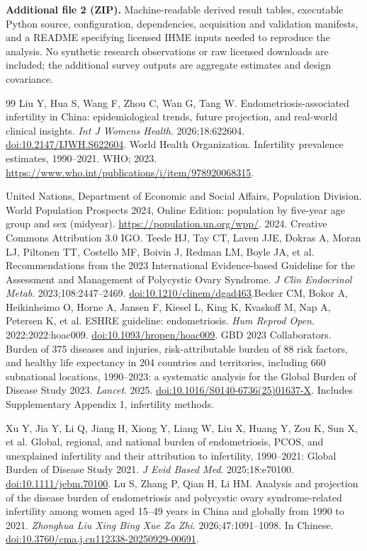 \documentclass[11pt,a4paper]{article}
\begin{document}
\textbf{Additional file 2 (ZIP).} Machine-readable derived result tables, executable Python source, configuration, dependencies, acquisition and validation manifests, and a README specifying licensed IHME inputs needed to reproduce the analysis. No synthetic research observations or raw licensed downloads are included; the additional survey outputs are aggregate estimates and design covariance.
{\small\doublespacing
\begin{thebibliography}{99}
 Liu Y, Hua S, Wang F, Zhou C, Wan G, Tang W. Endometriosis-associated infertility in China: epidemiological trends, future projection, and real-world clinical insights. \emph{Int J Womens Health}. 2026;18:622604. \href{https://doi.org/10.2147/IJWH.S622604}{doi:10.2147/IJWH.S622604}.
 World Health Organization. Infertility prevalence estimates, 1990--2021. WHO; 2023. \url{https://www.who.int/publications/i/item/978920068315}.

 United Nations, Department of Economic and Social Affairs, Population Division. World Population Prospects 2024, Online Edition: population by five-year age group and sex (midyear). \url{https://population.un.org/wpp/}. 2024. Creative Commons Attribution 3.0 IGO.
Teede HJ, Tay CT, Laven JJE, Dokras A, Moran LJ, Piltonen TT, Costello MF, Boivin J, Redman LM, Boyle JA, et al. Recommendations from the 2023 International Evidence-based Guideline for the Assessment and Management of Polycystic Ovary Syndrome. \emph{J Clin Endocrinol Metab}. 2023;108:2447--2469. \href{https://doi.org/10.1210/clinem/dgad463}{doi:10.1210/clinem/dgad463}.Becker CM, Bokor A, Heikinheimo O, Horne A, Jansen F, Kiesel L, King K, Kvaskoff M, Nap A, Petersen K, et al. ESHRE guideline: endometriosis. \emph{Hum Reprod Open}. 2022;2022:hoac009. \href{https://doi.org/10.1093/hropen/hoac009}{doi:10.1093/hropen/hoac009}. GBD 2023 Collaborators. Burden of 375 diseases and injuries, risk-attributable burden of 88 risk factors, and healthy life expectancy in 204 countries and territories, including 660 subnational locations, 1990--2023: a systematic analysis for the Global Burden of Disease Study 2023. \emph{Lancet}. 2025. \href{https://doi.org/10.1016/S0140-6736(25)01637-X}{doi:10.1016/S0140-6736(25)01637-X}. Includes Supplementary Appendix 1, infertility methods.

Xu Y, Jia Y, Li Q, Jiang H, Xiong Y, Liang W, Liu X, Huang Y, Zou K, Sun X, et al. Global, regional, and national burden of endometriosis, PCOS, and unexplained infertility and their attribution to infertility, 1990--2021: Global Burden of Disease Study 2021. \emph{J Evid Based Med}. 2025;18:e70100. \href{https://doi.org/10.1111/jebm.70100}{doi:10.1111/jebm.70100}. Lu S, Zhang P, Qian H, Li HM. Analysis and projection of the disease burden of endometriosis and polycystic ovary syndrome-related infertility among women aged 15--49 years in China and globally from 1990 to 2021. \emph{Zhonghua Liu Xing Bing Xue Za Zhi}. 2026;47:1091--1098. In Chinese. \href{https://doi.org/10.3760/cma.j.cn112338-20250929-00691}{doi:10.3760/cma.j.cn112338-20250929-00691}.


\end{thebibliography}}
\end{document}
